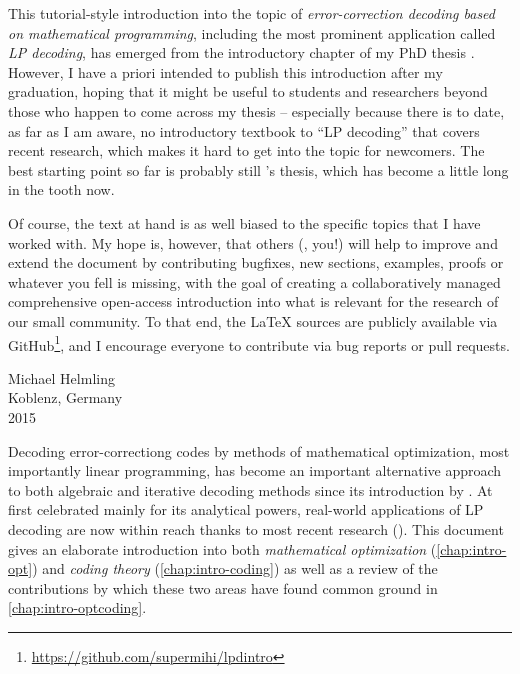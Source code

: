 \documentclass[
  paper=a4,
  parskip=half,
  english,
  fontsize=11pt,
  BCOR=1mm,
  DIV=10,
  twoside=true,
  toc=bib,
  numbers=noendperiod
]{scrbook}
\title{\mytitle}
\subtitle{A tutorial}
\author{\myauthor}
\theoremstyle{change}
\theoremstyle{nonumberplain}
\begin{document}
\maketitle
\tableofcontents

This tutorial-style introduction into the topic of \emph{error-correction decoding based on mathematical programming}, including the most prominent application called \emph{LP decoding}, has emerged from the introductory chapter of my PhD thesis \cite{Helmling15PhD}. However, I have a priori intended to publish this introduction after my graduation, hoping that it might be useful to students and researchers beyond those who happen to come across my thesis – especially because there is to date, as far as I am aware, no introductory textbook to \enquote{LP decoding} that covers recent research, which makes it hard to get into the topic for newcomers. The best starting point so far is probably still \citeauthor{Feldman03PhD}'s thesis, which has become a little long in the tooth now.

Of course, the text at hand is as well biased to the specific topics that I have worked with. My hope is, however, that others (\ie, you!) will help to improve and extend the document by contributing bugfixes, new sections, examples, proofs or whatever you fell is missing, with the goal of creating a collaboratively managed comprehensive open-access introduction into what is relevant for the research of our small community. To that end, the \LaTeX{} sources are publicly available via GitHub\footnote{\url{https://github.com/supermihi/lpdintro}}, and I encourage everyone to contribute via bug reports or pull requests.
\begin{FlushRight}
  Michael Helmling\\
  Koblenz, Germany\\
  2015
\end{FlushRight}

Decoding error-correctiong codes by methods of mathematical optimization, most importantly linear programming, has become an important alternative approach to both algebraic and iterative decoding methods since its introduction by \textcite{Feldman+05LPDecoding}. At first celebrated mainly for its analytical powers, real-world applications of LP decoding are now within reach thanks to most recent research (\cite{Liu+12PenalizedLPD, Gensheimer+14SimplexHard}). This document gives an elaborate introduction into both \emph{mathematical optimization} (\cref{chap:intro-opt}) and \emph{coding theory} (\cref{chap:intro-coding}) as well as a review of the contributions by which these two areas have found common ground in \cref{chap:intro-optcoding}.
\end{document}
